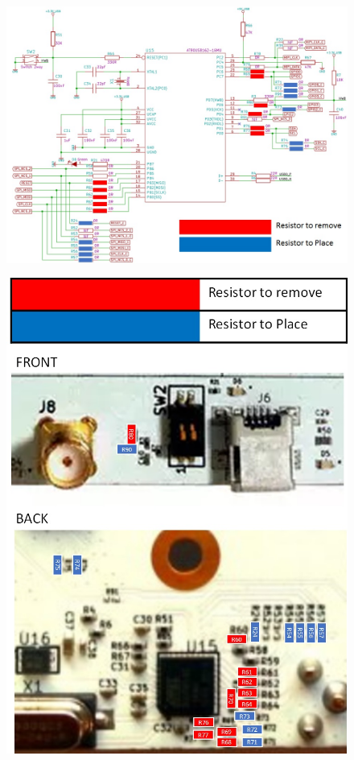 \documentclass{article}
\begin{document}
  	\begin{figure}[h]
  		\begin{center}
		\includegraphics[scale=0.6]{zipper_microcontroller}
		\end{center}
	\end{figure}
	\label{fig:zipper_microcontroller}
	\pagebreak
	\begin{figure}[ht]
		\begin{center}
		\includegraphics[scale=0.6]{zipper_layout2}
		\end{center}
	\end{figure}
	\label{fig:zipper_layout2}
	\pagebreak
\end{document}
